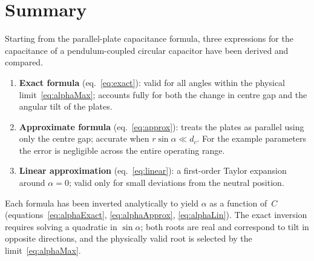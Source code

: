 \documentclass[11pt,a4paper]{article}
\begin{document}
\section{Summary}

Starting from the parallel-plate capacitance formula, three expressions
for the capacitance of a pendulum-coupled circular capacitor have been
derived and compared.

\begin{enumerate}

  \item \textbf{Exact formula} (eq.~\ref{eq:exact}): valid for all
        angles within the physical limit~\eqref{eq:alphaMax}; accounts
        fully for both the change in centre gap and the angular tilt of
        the plates.

  \item \textbf{Approximate formula} (eq.~\ref{eq:approx}): treats the
        plates as parallel using only the centre gap; accurate when
        $r\sin\alpha \ll d_c$.  For the example parameters the error is
        negligible across the entire operating range.

  \item \textbf{Linear approximation} (eq.~\ref{eq:linear}): a
        first-order Taylor expansion around $\alpha = 0$; valid only for
        small deviations from the neutral position.

\end{enumerate}

Each formula has been inverted analytically to yield $\alpha$ as a
function of~$C$ (equations~\ref{eq:alphaExact},
\ref{eq:alphaApprox}, \ref{eq:alphaLin}).  The exact inversion requires
solving a quadratic in $\sin\alpha$; both roots are real and correspond
to tilt in opposite directions, and the physically valid root is selected
by the limit~\eqref{eq:alphaMax}.
\end{document}
